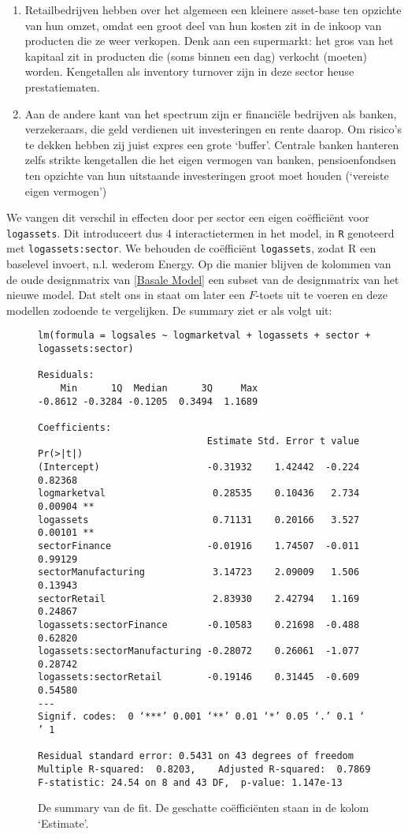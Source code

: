 \documentclass[a4paper]{report}
\begin{document}
  \begin{enumerate}
    \item Retailbedrijven hebben over het algemeen een kleinere asset-base ten opzichte van hun omzet, omdat een groot deel van hun kosten zit in de inkoop van producten die ze weer verkopen. Denk aan een supermarkt: het gros van het kapitaal zit in producten die (soms binnen een dag) verkocht (moeten) worden. Kengetallen als inventory turnover zijn in deze sector heuse prestatiematen.
    
    \item Aan de andere kant van het spectrum zijn er financi\"ele bedrijven als banken, verzekeraars, die geld verdienen uit investeringen en rente daarop. Om risico's te dekken hebben zij juist expres een grote `buffer'. Centrale banken hanteren zelfs strikte kengetallen die het eigen vermogen van banken, pensioenfondsen ten opzichte van hun uitstaande investeringen groot moet houden (`vereiste eigen vermogen')
\end{enumerate} 
  
  We vangen dit verschil in effecten door per sector een eigen co\"effici\"ent voor \verb!logassets!. Dit introduceert dus 4 interactietermen in het model, in \verb!R! genoteerd met \verb!logassets:sector!. We behouden de co\"effici\"ent \verb!logassets!, zodat R een baselevel invoert, n.l. wederom Energy. Op die manier blijven de kolommen van de oude designmatrix van \ref{Basale Model} een subset van de designmatrix van het nieuwe model. Dat stelt ons in staat om later een $F$-toets uit te voeren en deze modellen zodoende te vergelijken. De summary ziet er als volgt uit:
  
  \begin{figure}[H]
  \begin{verbatim}
lm(formula = logsales ~ logmarketval + logassets + sector + logassets:sector)

Residuals:
    Min      1Q  Median      3Q     Max 
-0.8612 -0.3284 -0.1205  0.3494  1.1689 

Coefficients:
                              Estimate Std. Error t value Pr(>|t|)   
(Intercept)                   -0.31932    1.42442  -0.224  0.82368   
logmarketval                   0.28535    0.10436   2.734  0.00904 **
logassets                      0.71131    0.20166   3.527  0.00101 **
sectorFinance                 -0.01916    1.74507  -0.011  0.99129   
sectorManufacturing            3.14723    2.09009   1.506  0.13943   
sectorRetail                   2.83930    2.42794   1.169  0.24867   
logassets:sectorFinance       -0.10583    0.21698  -0.488  0.62820   
logassets:sectorManufacturing -0.28072    0.26061  -1.077  0.28742   
logassets:sectorRetail        -0.19146    0.31445  -0.609  0.54580   
---
Signif. codes:  0 ‘***’ 0.001 ‘**’ 0.01 ‘*’ 0.05 ‘.’ 0.1 ‘ ’ 1

Residual standard error: 0.5431 on 43 degrees of freedom
Multiple R-squared:  0.8203,	Adjusted R-squared:  0.7869 
F-statistic: 24.54 on 8 and 43 DF,  p-value: 1.147e-13
  \end{verbatim}
  \caption{De summary van de fit. De geschatte co\"effici\"enten staan in de kolom `Estimate'. }
  \end{figure}
  
\end{document}
